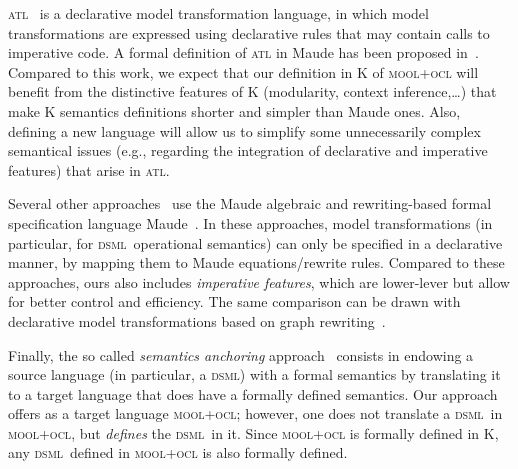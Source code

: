 \documentclass[a4paper,11pt,twoside]{article}
\newcommand{\dsml}{\textsc{dsml}}
\begin{document}
\textsc{atl}~\cite{DBLP:journals/scp/JouaultABK08} is a declarative model transformation language, in which model transformations are expressed using declarative rules that may contain calls to imperative code. A formal definition of \textsc{atl} in Maude has been proposed in~\cite{DBLP:conf/icmt/TroyaV10}. Compared to this work, we expect that our definition in K of   \textsc{mool+ocl}
will  benefit from the distinctive features of K (modularity, context inference,\ldots) that make K semantics definitions  shorter and simpler than Maude ones. Also, defining a new language will allow us to  simplify some unnecessarily complex semantical issues
 (e.g., regarding the integration of  declarative and imperative features) that arise in \textsc{atl}.

Several other approaches~\cite{bhm08,rdv09,r10b} use the Maude algebraic and rewriting-based formal specification language Maude~\cite{allAboutMaude}.  In these approaches, model transformations (in particular, 
for \dsml\ operational semantics) can only be specified in a declarative manner, by mapping them to Maude equations/rewrite rules.
 Compared to these approaches, ours also includes \emph{imperative features}, which are lower-lever but allow for better
control and efficiency.
The same comparison can be drawn with declarative model transformations based on graph rewriting~\cite{DBLP:conf/agtive/Taentzer03,DBLP:conf/kbse/CsertanHMPPV02}.

Finally, the so called \emph{semantics anchoring} approach~\cite{DBLP:conf/ecmdafa/0003SAJ05} consists in endowing a source language (in particular, a \dsml) with a formal semantics by translating it
 to a target language that does have a formally defined  semantics. Our approach offers as a target language
\textsc{mool+ocl}; however, one does not translate a \dsml\ in \textsc{mool+ocl}, but \emph{defines} the \dsml\ in it.
Since  \textsc{mool+ocl}
is formally defined in K, any \dsml\ defined in  \textsc{mool+ocl} is also formally defined.


\end{document}

